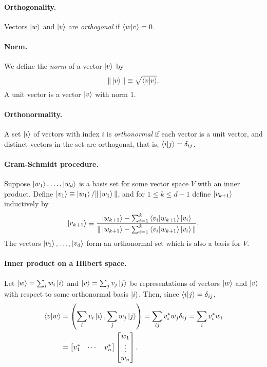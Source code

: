 \documentclass{article}
\numberwithin{theorem}{section}
\numberwithin{corollary}{section}
\begin{document}
\paragraph{Orthogonality.} Vectors $\ket{w}$ and $\ket{v}$ are
\emph{orthogonal} if $\ip{w}{v} = 0$.

\paragraph{Norm.} We define the \emph{norm} of a vector $\ket{v}$ by \[
  \|\ket{v}\| \equiv \sqrt{\ip{v}{v}}.
\] A unit vector is a vector $\ket{v}$ with norm 1.

\paragraph{Orthonormality.} A set $\ket{i}$ of vectors with index $i$ is
\emph{orthonormal} if each vector is a unit vector, and distinct vectors in the
set are orthogonal, that is, $\ip{i}{j} = \delta_{ij}$.

\paragraph{Gram-Schmidt procedure.} Suppose $\ket{w_1}, \ldots, \ket{w_d}$ is a
basis set for some vector space $V$ with an inner product. Define $\ket{v_1}
\equiv \ket{w_1}/\|\ket{w_1}\|$, and for $1 \leq k \leq d - 1$ define
$\ket{v_{k+1}}$ inductively by \[
  \ket{v_{k+1}} \equiv \frac{
    \ket{w_{k+1}} - \sum_{i=1}^k \ip{v_i}{w_{k+1}}\ket{v_i}
  }{
    \|\ket{w_{k+1}} - \sum_{i=1}^k \ip{v_i}{w_{k+1}}\ket{v_i}\|
  }.
\] The vectors $\ket{v_1}, \ldots, \ket{v_d}$ form an orthonormal set which is
also a basis for $V$.

\paragraph{Inner product on a Hilbert space.} Let $\ket{w} = \sum_i w_i\ket{i}$
and $\ket{v} = \sum_j v_j\ket{j}$ be representations of vectors $\ket{w}$ and
$\ket{v}$ with respect to some orthonormal basis $\ket{i}$. Then, since
$\ip{i}{j} = \delta_{ij}$,
\begin{align*}
  \ip{v}{w}
  &= \left(\sum_i v_i\ket{i}, \sum_j w_j\ket{j}\right)
  = \sum_{ij} v_i^*w_j\delta_{ij}
  = \sum_i v_i^*w_i \\
  &=
  \begin{bmatrix}
    v_1^* & \cdots & v_n^*
  \end{bmatrix}
  \begin{bmatrix}
    w_1 \\
    \vdots \\
    w_n
  \end{bmatrix}.
\end{align*}
\end{document}
